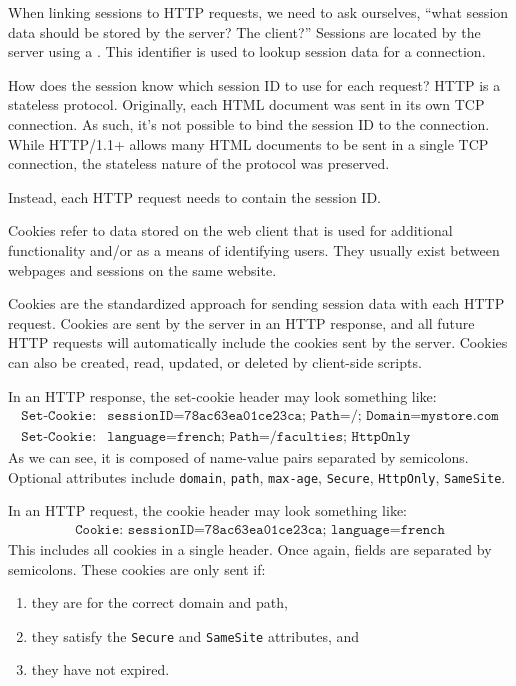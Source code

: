 When linking sessions to HTTP requests, we need to ask ourselves, ``what session data should be stored by the server? The client?'' Sessions are located by the server using a . This identifier is used to lookup session data for a connection.

How does the session know which session ID to use for each request? HTTP is a stateless protocol. Originally, each HTML document was sent in its own TCP connection. As such, it's not possible to bind the session ID to the connection. While HTTP/1.1+ allows many HTML documents to be sent in a single TCP connection, the stateless nature of the protocol was preserved.

\begin{notebox}
    Instead, each HTTP request needs to contain the session ID.
\end{notebox}

\begin{dfnbox}{Cookies}{}
     refer to data stored on the web client that is used for additional functionality and/or as a means of identifying users. They usually exist between webpages and sessions on the same website.
\end{dfnbox}

Cookies are the standardized approach for sending session data with each HTTP request. Cookies are sent by the server in an HTTP response, and all future HTTP requests will automatically include the cookies sent by the server. Cookies can also be created, read, updated, or deleted by client-side scripts.

In an HTTP response, the set-cookie header may look something like:
\begin{align*}
    \texttt{Set-Cookie:} & \texttt{sessionID=78ac63ea01ce23ca; Path=/; Domain=mystore.com} \\
    \texttt{Set-Cookie:} & \texttt{language=french; Path=/faculties; HttpOnly}
\end{align*}
As we can see, it is composed of name-value pairs separated by semicolons. Optional attributes include \texttt{domain}, \texttt{path}, \texttt{max-age}, \texttt{Secure}, \texttt{HttpOnly}, \texttt{SameSite}.

In an HTTP request, the cookie header may look something like:
\begin{align*}
    \texttt{Cookie: sessionID=78ac63ea01ce23ca; language=french}
\end{align*}
This includes all cookies in a single header. Once again, fields are separated by semicolons. These cookies are only sent if:
\begin{enumerate}[noitemsep]
    \item they are for the correct domain and path,
    \item they satisfy the \texttt{Secure} and \texttt{SameSite} attributes, and
    \item they have not expired.
\end{enumerate}

